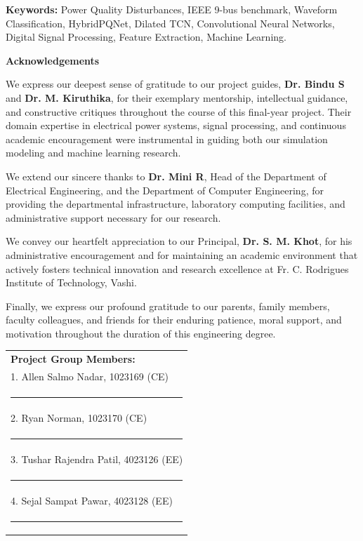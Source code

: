 \documentclass[12pt,a4paper]{report}
\begin{document}
\vspace{0.3cm}
\noindent\textbf{Keywords:} Power Quality Disturbances, IEEE 9-bus benchmark, Waveform Classification, HybridPQNet, Dilated TCN, Convolutional Neural Networks, Digital Signal Processing, Feature Extraction, Machine Learning.
\clearpage

\begin{center}
\vspace*{0.2cm}
{\LARGE\bf Acknowledgements}\\[0.5cm]
\end{center}

\justify
We express our deepest sense of gratitude to our project guides, \textbf{Dr. Bindu S} and \textbf{Dr. M. Kiruthika}, for their exemplary mentorship, intellectual guidance, and constructive critiques throughout the course of this final-year project. Their domain expertise in electrical power systems, signal processing, and continuous academic encouragement were instrumental in guiding both our simulation modeling and machine learning research.

We extend our sincere thanks to \textbf{Dr. Mini R}, Head of the Department of Electrical Engineering, and the Department of Computer Engineering, for providing the departmental infrastructure, laboratory computing facilities, and administrative support necessary for our research.

We convey our heartfelt appreciation to our Principal, \textbf{Dr. S. M. Khot}, for his administrative encouragement and for maintaining an academic environment that actively fosters technical innovation and research excellence at Fr. C. Rodrigues Institute of Technology, Vashi.

Finally, we express our profound gratitude to our parents, family members, faculty colleagues, and friends for their enduring patience, moral support, and motivation throughout the duration of this engineering degree.

\vspace{1.5cm}
\hfill
\begin{tabular}[t]{l@{}}
{\large\textbf{Project Group Members:}} \\[0.5cm]

1. Allen Salmo Nadar, 1023169 (CE) \\[0.12cm]
\noindent\rule{6cm}{0.4pt} \\[0.65cm]

2. Ryan Norman, 1023170 (CE) \\[0.12cm]
\noindent\rule{6cm}{0.4pt} \\[0.65cm]

3. Tushar Rajendra Patil, 4023126 (EE) \\[0.12cm]
\noindent\rule{6cm}{0.4pt} \\[0.65cm]

4. Sejal Sampat Pawar, 4023128 (EE) \\[0.12cm]
\noindent\rule{6cm}{0.4pt}
\end{tabular}
\end{document}
